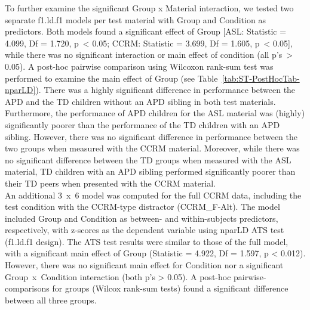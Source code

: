\documentclass[a4paper, twoside]{templates/ociamthesis}
\begin{document}
To further examine the significant Group x Material interaction, we tested two separate f1.ld.f1 models per test material with Group and Condition as predictors. Both models found a significant effect of Group {[}ASL: Statistic = 4.099, Df = 1.720, p~\textless{} 0.05; CCRM: Statistic = 3.699, Df = 1.605, p~\textless{} 0.05{]}, while there was no significant interaction or main effect of condition (all p's~\textgreater{} 0.05). A post-hoc pairwise comparison using Wilcoxon rank-sum test was performed to examine the main effect of Group (see Table~\ref{tab:ST-PostHocTab-nparLD}). There was a highly significant difference in performance between the APD and the TD children without an APD sibling in both test materials. Furthermore, the performance of APD children for the ASL material was (highly) significantly poorer than the performance of the TD children with an APD sibling. However, there was no significant difference in performance between the two groups when measured with the CCRM material. Moreover, while there was no significant difference between the TD groups when measured with the ASL material, TD children with an APD sibling performed significantly poorer than their TD peers when presented with the CCRM material.\\

An additional 3~x~6 model was computed for the full CCRM data, including the test condition with the CCRM-type distractor (CCRM\_F-Alt). The model included Group and Condition as between- and within-subjects predictors, respectively, with z-scores as the dependent variable using nparLD ATS test (f1.ld.f1 design). The ATS test results were similar to those of the full model, with a significant main effect of Group (Statistic = 4.922, Df = 1.597, p \textless{} 0.012). However, there was no significant main effect for Condition nor a significant Group~x~Condition interaction (both p's \textgreater{} 0.05). A post-hoc pairwise-comparisons for groups (Wilcox rank-sum tests) found a significant difference between all three groups.
\end{document}
